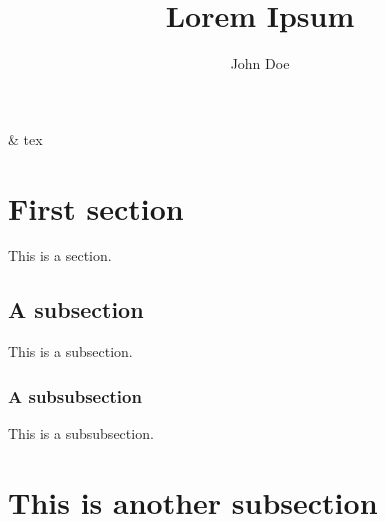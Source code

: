 & tex

\newcommand*{\abs}[1]{\left|#1\right|}

\title{Lorem Ipsum}
\author{John Doe}



\section{First section}

This is a section.

\subsection{A subsection}

This is a subsection.

\subsubsection{A subsubsection}

This is a subsubsection.

\section{This is another subsection}


